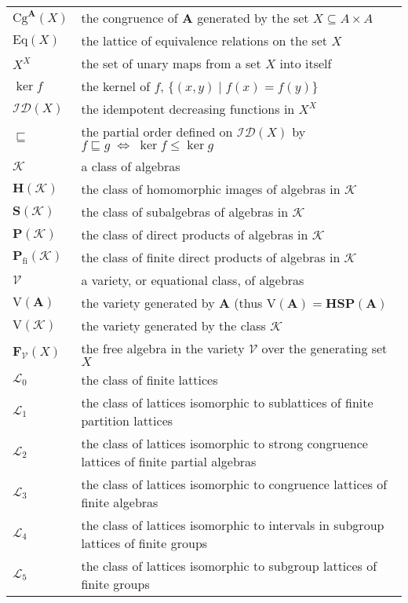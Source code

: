 \documentclass[cm,dissertation,actual,final]{uhthesis}
\theoremstyle{plain}
\theoremstyle{definition}
\theoremstyle{remark}
\numberwithin{theorem}{section}
\numberwithin{claim}{chapter}
\numberwithin{equation}{section}
\numberwithin{conjecture}{chapter}
\newcommand{\<}{\ensuremath{\langle}}
\renewcommand{\>}{\ensuremath{\rangle}}
\renewcommand{\leq}{\ensuremath{\leqslant}}
\newcommand{\ID}[1]{\ensuremath{\mathcal{ID}(#1)}}
\newcommand{\Eq}{\ensuremath{\mathrm{Eq}}}
\newcommand{\Cg}{\ensuremath{\mathrm{Cg}}}
\newcommand{\0}{\ensuremath{\mathbf{0}}}
\newcommand{\1}{\ensuremath{\mathbf{1}}}
\newcommand{\2}{\ensuremath{\mathbf{2}}}
\newcommand{\3}{\ensuremath{\mathbf{3}}}
\newcommand{\4}{\ensuremath{\mathbf{4}}}
\newcommand{\5}{\ensuremath{\mathbf{5}}}
\newcommand{\bA}{\ensuremath{\mathbf{A}}}
\newcommand{\bF}{\ensuremath{\mathbf{F}}}
\newcommand{\bH}{\ensuremath{\mathbf{H}}}
\newcommand{\sK}{\ensuremath{\mathscr{K}}}
\newcommand{\sL}{\ensuremath{\mathscr{L}}}
\newcommand{\bP}{\ensuremath{\mathbf{P}}}
\newcommand{\bS}{\ensuremath{\mathbf{S}}}
\newcommand{\V}{\ensuremath{\mathrm{V}}}
\newcommand{\sV}{\ensuremath{\mathscr{V}}}
\begin{document}
\begin{frontmatter}
\begin{table}
\begin{tabular}{ll}
      $\Cg^{\bA}(X)$& the congruence of $\bA$ generated by the set $X\subseteq A\times A$\\
      $\Eq(X)$& the lattice of equivalence relations on the set $X$\\
      $X^X$ & the set of unary maps from a set $X$ into itself\\
      $\ker f$ & the kernel of $f$, $\{(x,y) \mid f(x) = f(y)\}$\\
      $\ID{X}$ & the idempotent decreasing functions in $X^X$\\
      $\sqsubseteq$ & the partial order defined on $\ID{X}$ by $f\sqsubseteq g \;
      \Leftrightarrow \; \ker f \leq \ker g$\\
      $\sK$ & a class of algebras\\
      $\bH (\sK)$ & the class of homomorphic images of algebras in $\sK$\\
      $\bS (\sK)$ & the class of subalgebras of algebras in $\sK$\\
      $\bP (\sK)$ & the class of direct products of algebras in $\sK$\\
      $\bP_{\mathrm{fi}} (\sK)$ & the class of finite direct products of
      algebras in $\sK$\\ 
      $\sV$ & a variety, or equational class, of algebras\\
      $\V(\bA)$ & the variety generated by $\bA$ 
      (thus $\V(\bA) = \bH \bS \bP(\bA)$\\
      $\V(\sK)$ & the variety generated by the class $\sK$\\
      $\bF_{\sV}(X)$& the free algebra in the variety $\sV$ over the
      generating set $X$\\
      $\sL_0$ & the class of finite lattices\\
      $\sL_1$ & the class of lattices isomorphic to sublattices of finite partition lattices\\
      $\sL_2$ & the class of lattices isomorphic to strong congruence lattices of
      finite partial algebras\\
      $\sL_3$ & the class of lattices isomorphic to congruence lattices of finite algebras\\
      $\sL_4$ & the class of lattices isomorphic to intervals in subgroup lattices of finite groups\\
      $\sL_5$ & the class of lattices isomorphic to subgroup lattices of finite groups\\
    \end{tabular}
\end{table}

\end{frontmatter}
\end{document}
